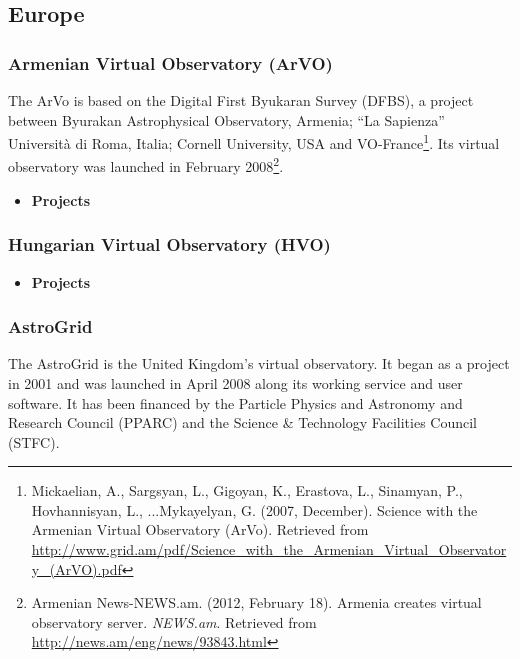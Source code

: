 \documentclass[11pt]{article}
\begin{document}
        \subsection{Europe}
            \subsubsection{Armenian Virtual Observatory (ArVO)}
                The ArVo is based on the Digital First Byukaran Survey (DFBS), a
project between Byurakan Astrophysical Observatory, Armenia; ``La Sapienza''
Universit\`{a} di Roma, Italia; Cornell University, USA and
VO-France\footnote{Mickaelian, A., Sargsyan, L., Gigoyan, K., Erastova, L.,
Sinamyan, P., Hovhannisyan, L., ...Mykayelyan, G. (2007, December). Science with
the Armenian Virtual Observatory (ArVo).  Retrieved from
\url{http://www.grid.am/pdf/Science_with_the_Armenian_Virtual_Observatory_(ArVO).pdf}}.
Its virtual observatory was launched in February 2008\footnote{Armenian
News-NEWS.am. (2012, February 18). Armenia creates virtual observatory server.
\textit{NEWS.am}. Retrieved from \url{http://news.am/eng/news/93843.html}}.

                \begin{itemize}
                    \item \textbf{Projects}
                \end{itemize}

            \subsubsection{Hungarian Virtual Observatory (HVO)}
                \begin{itemize}
                    \item \textbf{Projects}
                \end{itemize}

            \subsubsection{AstroGrid}
                The AstroGrid is the United Kingdom's virtual observatory. It
began as a project in 2001 and was launched in April 2008 along its working
service and user software. It has been financed by the Particle Physics and
Astronomy and Research Council (PPARC) and the Science \& Technology Facilities
Council (STFC).
\end{document}
